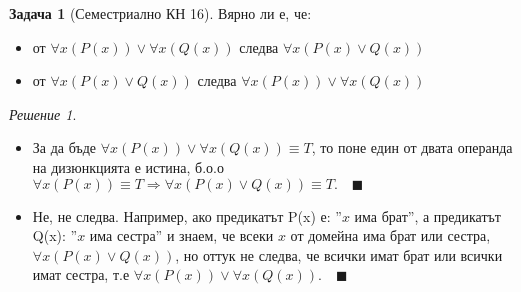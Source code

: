 \documentclass[10pt, a4paper]{article}
\theoremstyle{definition}
\newtheorem{problem}{Задача}
\theoremstyle{remark}
\newtheorem*{sol}{Решение}
\begin{document}
\hfill
\begin{problem}[Семестриално КН 16]
    Вярно ли е, че:
    \begin{itemize}
        \item от \(\forall x(P(x)) \vee \forall x(Q(x))\) следва \(\forall x(P(x)\vee Q(x))\) 
        \item от \(\forall x(P(x)\vee Q(x))\) следва \(\forall x(P(x)) \vee \forall x(Q(x))\) 
    \end{itemize}
\end{problem}
\begin{sol}\hfill
    \begin{itemize}
        \item За да бъде \(\forall x(P(x)) \vee \forall x(Q(x))\equiv T\), то поне един от двата операнда на дизюнкцията е истина, б.о.о \(\forall x(P(x))\equiv T\Rightarrow \forall x(P(x)\vee Q(x))\equiv T.\quad\blacksquare\)
        \item Не, не следва. Например, ако предикатът P(x) е: ''\(x\) има брат'', а предикатът Q(x): ''\(x\) има сестра'' и знаем, че всеки \(x\) от домейна има брат или сестра, \(\forall x(P(x)\vee Q(x))\), но оттук не следва, че всички имат брат или всички имат сестра, т.е \(\forall x(P(x))\vee\forall x(Q(x)).\quad\blacksquare\)
    \end{itemize}
\end{sol}
\end{document}
